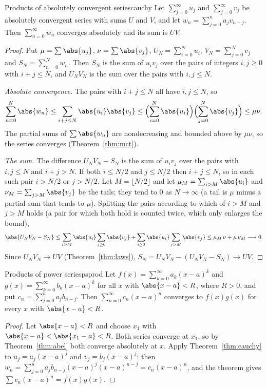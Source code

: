 \documentclass[11pt]{article}
\begin{document}
\begin{thm}{Products of absolutely convergent series}{cauchy}
Let $\sum_{j=0}^\infty u_j$ and $\sum_{j=0}^\infty v_j$ be absolutely convergent series with sums $U$ and $V$, and let $w_n=\sum_{j=0}^nu_jv_{n-j}$. Then $\sum_{n=0}^\infty w_n$ converges absolutely and its sum is $UV$.
\end{thm}
\begin{proof}
Put $\mu=\sum\abs{u_j}$, $\nu=\sum\abs{v_j}$, $U_N=\sum_{i=0}^Nu_i$, $V_N=\sum_{j=0}^Nv_j$ and $S_N=\sum_{n=0}^Nw_n$. Then $S_N$ is the sum of $u_iv_j$ over the pairs of integers $i,j\ge0$ with $i+j\le N$, and $U_NV_N$ is the sum over the pairs with $i,j\le N$.

\emph{Absolute convergence.} The pairs with $i+j\le N$ all have $i,j\le N$, so
\[
\sum_{n=0}^N\abs{w_n}\le\sum_{i+j\le N}\abs{u_i}\abs{v_j}\le\Bigl(\sum_{i=0}^N\abs{u_i}\Bigr)\Bigl(\sum_{j=0}^N\abs{v_j}\Bigr)\le\mu\nu .
\]
The partial sums of $\sum\abs{w_n}$ are nondecreasing and bounded above by $\mu\nu$, so the series converges (Theorem~\ref{thm:mct}).

\emph{The sum.} The difference $U_NV_N-S_N$ is the sum of $u_iv_j$ over the pairs with $i,j\le N$ and $i+j>N$. If both $i\le N/2$ and $j\le N/2$ then $i+j\le N$, so in each such pair $i>N/2$ or $j>N/2$. Let $M=\lfloor N/2\rfloor$ and let $\mu_M=\sum_{i>M}\abs{u_i}$ and $\nu_M=\sum_{j>M}\abs{v_j}$ be the tails; they tend to $0$ as $N\to\infty$ (a tail is $\mu$ minus a partial sum that tends to $\mu$). Splitting the pairs according to which of $i>M$ and $j>M$ holds (a pair for which both hold is counted twice, which only enlarges the bound),
\[
\abs{U_NV_N-S_N}\le\sum_{i>M}\abs{u_i}\sum_{j\ge0}\abs{v_j}+\sum_{i\ge0}\abs{u_i}\sum_{j>M}\abs{v_j}\le\mu_M\,\nu+\mu\,\nu_M\longrightarrow0 .
\]
Since $U_NV_N\to UV$ (Theorem~\ref{thm:laws}), $S_N=U_NV_N-(U_NV_N-S_N)\to UV$.
\end{proof}

\begin{thm}{Products of power series}{psprod}
Let $f(x)=\sum_{k=0}^\infty a_k(x-a)^k$ and $g(x)=\sum_{k=0}^\infty b_k(x-a)^k$ for all $x$ with $\abs{x-a}<R$, where $R>0$, and put $c_n=\sum_{j=0}^na_jb_{n-j}$. Then $\sum_{n=0}^\infty c_n(x-a)^n$ converges to $f(x)g(x)$ for every $x$ with $\abs{x-a}<R$.
\end{thm}
\begin{proof}
Let $\abs{x-a}<R$ and choose $x_1$ with $\abs{x-a}<\abs{x_1-a}<R$. Both series converge at $x_1$, so by Theorem~\ref{thm:abel} both converge absolutely at $x$. Apply Theorem~\ref{thm:cauchy} to $u_j=a_j(x-a)^j$ and $v_j=b_j(x-a)^j$: then $w_n=\sum_{j=0}^na_jb_{n-j}(x-a)^{j}(x-a)^{n-j}=c_n(x-a)^n$, and the theorem gives $\sum c_n(x-a)^n=f(x)g(x)$.
\end{proof}
\end{document}
